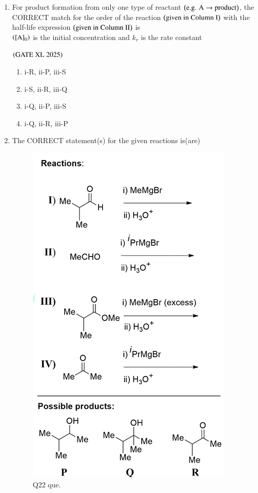 \documentclass[journal]{IEEEtran}
\begin{document}
\begin{enumerate}
    \item For product formation from only one type of reactant $\left(\text{e.g. A} \rightarrow \text{product}\right)$, the CORRECT match for the order of the reaction $\left(\text{given in Column I}\right)$ with the half-life expression $\left(\text{given in Column II}\right)$ is\\
    $\left(\text{[A]}_0\right)$ is the initial concentration and $k_r$ is the rate constant

    \hfill $\left(\text{GATE XL 2025}\right)$

    \begin{enumerate}
        \item i-R, ii-P, iii-S
        \item i-S, ii-R, iii-Q
        \item i-Q, ii-P, iii-S
        \item i-Q, ii-R, iii-P
    \end{enumerate}

    \item The CORRECT statement(s) for the given reactions is(are)

    \begin{figure}[H]
        \centering
        \includegraphics[width=0.8\columnwidth]{figs/xl2025_q22_que.png}
        \caption*{Q22 que.}
        \label{fig:xl2025_q22_que}
    \end{figure}


\end{enumerate}
\end{document}
